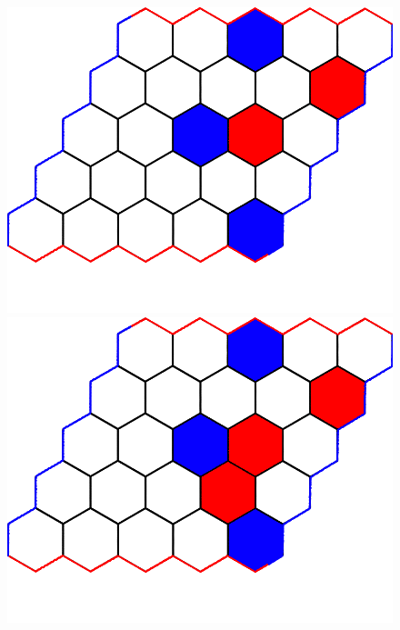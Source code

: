 \documentclass[a4paper]{article}
\begin{document}
\begin{figure}[t]
\begin{minipage}[t]{.24\linewidth}
    \includegraphics[width=\linewidth]{figures/example_game/ex_game_t5.png}
    \end{minipage}
    \begin{minipage}[t]{.24\linewidth}
    \includegraphics[width=\linewidth]{figures/example_game/ex_game_t6.png}
    \end{minipage}
    \begin{minipage}[t]{.24\linewidth}

\end{minipage}
\end{figure}
\end{document}
